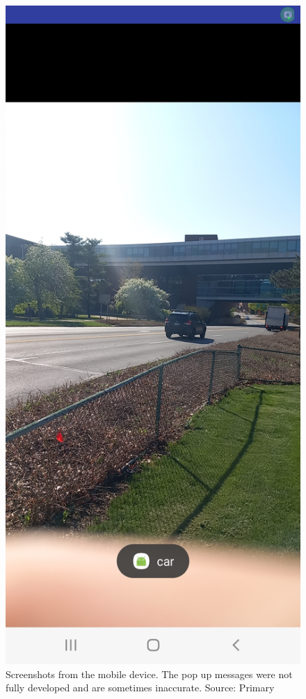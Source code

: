 \begin{figure}[H]
    \includegraphics[scale=0.11]{figure/ObjectDetection_noFrame.jpg}
    \caption{Screenshots from the mobile device. The pop up messages were not fully developed and are sometimes inaccurate. Source: Primary}
    \label{fig:Objectdetection-screenshot2}
\end{figure}
